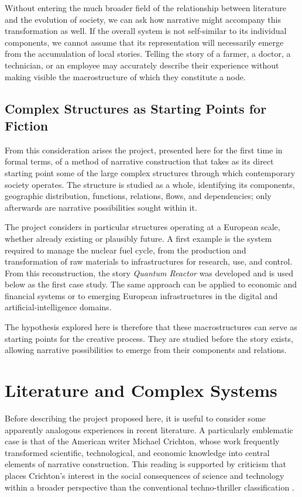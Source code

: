 \documentclass[11pt,a4paper]{article}
\begin{document}
Without entering the much broader field of the relationship between literature and the evolution of society, we can ask how narrative might accompany this transformation as well. If the overall system is not self-similar to its individual components, we cannot assume that its representation will necessarily emerge from the accumulation of local stories. Telling the story of a farmer, a doctor, a technician, or an employee may accurately describe their experience without making visible the macrostructure of which they constitute a node.
\subsection{Complex Structures as Starting Points for Fiction}
From this consideration arises the project, presented here for the first time in formal terms, of a method of narrative construction that takes as its direct starting point some of the large complex structures through which contemporary society operates. The structure is studied as a whole, identifying its components, geographic distribution, functions, relations, flows, and dependencies; only afterwards are narrative possibilities sought within it.

The project considers in particular structures operating at a European scale, whether already existing or plausibly future. A first example is the system required to manage the nuclear fuel cycle, from the production and transformation of raw materials to infrastructures for research, use, and control. From this reconstruction, the story \emph{Quantum Reactor} was developed and is used below as the first case study. The same approach can be applied to economic and financial systems or to emerging European infrastructures in the digital and artificial-intelligence domains.

The hypothesis explored here is therefore that these macrostructures can serve as starting points for the creative process. They are studied before the story exists, allowing narrative possibilities to emerge from their components and relations.


\section{Literature and Complex Systems}

Before describing the project proposed here, it is useful to consider some apparently analogous experiences in recent literature. A particularly emblematic case is that of the American writer Michael Crichton, whose work frequently transformed scientific, technological, and economic knowledge into central elements of narrative construction. This reading is supported by criticism that places Crichton's interest in the social consequences of science and technology within a broader perspective than the conventional techno-thriller classification \cite{stengler2015}.
\end{document}
